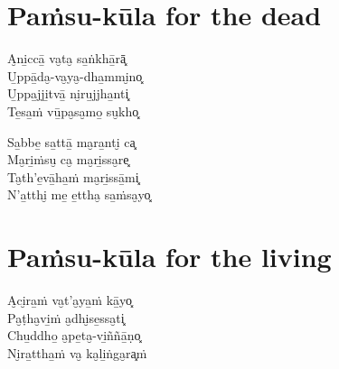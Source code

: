 \clearpage

\chapter{Paṁsu-kūla for the dead}


\begin{paritta}
A̮ni̱ccā̱ va̮ta̮ sa̱ṅkhā̱rā͓\\
U̱ppā̱da̮-va̮ya̮-dha̱mmi̮no͓\\
U̱ppa̱jji̱tvā̱ ni̮ru̱jjha̱nti͓\\
Te̱sa̱ṁ vū̱pa̮sa̮mo̱ su̮kho͓

Sa̱bbe̱ sa̱ttā̱ ma̮ra̱nti̮ ca͓\\
Ma̮ri̱ṁsu̮ ca̮ ma̮ri̱ssa̮re͓\\
Ta̮th'e̱vā̱ha̱ṁ ma̮ri̱ssā̱mi͓\\
N'a̱tthi̮ me̱ e̱ttha̮ sa̱ṁsa̮yo͓


\end{paritta}

\chapter{Paṁsu-kūla for the living}


\begin{paritta}
A̮ci̮ra̱ṁ va̮t'a̮ya̱ṁ kā̱yo͓\\
Pa̮ṭha̮vi̱ṁ a̮dhi̮se̱ssa̮ti͓\\
Chu̱ddho̱ a̮pe̱ta̮-vi̱ññā̱ṇo͓\\
Ni̮ra̱ttha̱ṁ va̮ ka̮li̱ṅga̮ra͓ṁ


\end{paritta}

